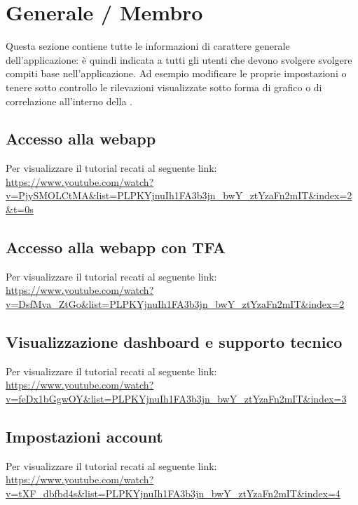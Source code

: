 \section{Generale / Membro}
Questa sezione contiene tutte le informazioni di carattere generale dell'applicazione: è quindi indicata a tutti gli utenti che devono svolgere svolgere compiti base nell'applicazione. Ad esempio modificare le proprie impostazioni o tenere sotto controllo le rilevazioni visualizzate sotto forma di grafico o di correlazione all'interno della .

\subsection{Accesso alla webapp}
Per visualizzare il tutorial recati al seguente link: 
\url{https://www.youtube.com/watch?v=PjySMOLCtMA&list=PLPKYjnuIh1FA3b3jn_bwY_ztYzaFn2mIT&index=2&t=0s}

\subsection{Accesso alla webapp con TFA}
Per visualizzare il tutorial recati al seguente link: 
\url{https://www.youtube.com/watch?v=DsfMva_ZtGo&list=PLPKYjnuIh1FA3b3jn_bwY_ztYzaFn2mIT&index=2}

\subsection{Visualizzazione dashboard e supporto tecnico}
Per visualizzare il tutorial recati al seguente link: 
\url{https://www.youtube.com/watch?v=feDx1bGgwOY&list=PLPKYjnuIh1FA3b3jn_bwY_ztYzaFn2mIT&index=3}

\subsection{Impostazioni account}
Per visualizzare il tutorial recati al seguente link:
\url{https://www.youtube.com/watch?v=tXF_dbfbd4s&list=PLPKYjnuIh1FA3b3jn_bwY_ztYzaFn2mIT&index=4}


